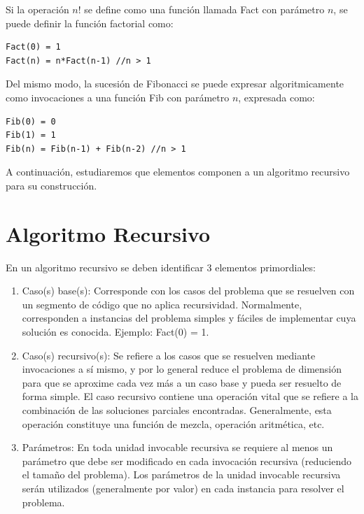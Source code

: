 Si la operación $n!$ se define como una función llamada Fact con parámetro $n$, se puede definir la función factorial como:

\begin{lstlisting}[upquote=true, language=pseudo]
Fact(0) = 1
Fact(n) = n*Fact(n-1) //n > 1
\end{lstlisting}

Del mismo modo, la sucesión de Fibonacci se puede expresar algoritmicamente como invocaciones a una función Fib con parámetro $n$, expresada como:

\begin{lstlisting}[upquote=true, language=pseudo]
Fib(0) = 0
Fib(1) = 1
Fib(n) = Fib(n-1) + Fib(n-2) //n > 1
\end{lstlisting}

A continuación, estudiaremos que elementos componen a un algoritmo recursivo para su construcción.

\section{Algoritmo Recursivo}

En un algoritmo recursivo se deben identificar 3 elementos primordiales:
\begin{enumerate}
\item Caso(s) base(s): Corresponde con los casos del problema que se resuelven con un segmento de código que no aplica recursividad. Normalmente, corresponden a instancias del problema simples y fáciles de implementar cuya solución es conocida. Ejemplo: Fact(0) = 1.
\item Caso(s) recursivo(s): Se refiere a los casos que se resuelven mediante invocaciones a sí mismo, y por lo general reduce el problema de dimensión para que se aproxime cada vez más a un caso base y pueda ser resuelto de forma simple. El caso recursivo contiene una operación vital que se refiere a la combinación de las soluciones parciales encontradas. Generalmente, esta operación constituye una función de mezcla, operación aritmética, etc.
\item Parámetros: En toda unidad invocable recursiva se requiere al menos un parámetro que debe ser modificado en cada invocación recursiva (reduciendo el tamaño del problema). Los parámetros de la unidad invocable recursiva serán utilizados (generalmente por valor) en cada instancia para resolver el problema.
\end{enumerate}

